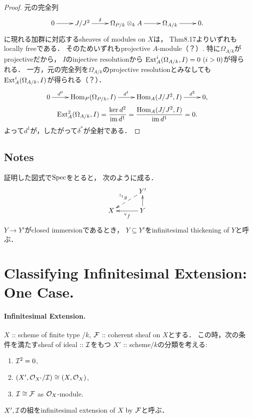 \documentclass[a4paper]{jsarticle}
\newcommand{\Der}{\Omega}
\begin{document}
    \begin{proof}
        元の完全列
        \[
        \xymatrix
        {
            0 \ar[r]& J/J^2 \ar[r]^-{\delta}& \Der_{P/k} \otimes_k A \ar[r]& \Der_{A/k} \ar[r]& 0.
        }
        \]
        に現れる加群に対応するsheaves of modules on $X$は，
        Thm8.17よりいずれもlocally freeである．
        そのためいずれもprojective $A$-module（？）.
        特に$\Der_{A/k}$がprojectiveだから，
        $I$のinjective resolutionから
        $\Ext_A^i(\Der_{A/k}, I)=0~(i>0)$が得られる．
        一方，元の完全列を$\Der_{A/k}$のprojective resolutionとみなしても
        $\Ext_A^i(\Der_{A/k}, I)$が得られる（？）．
        \begin{gather*}
        \xymatrix
        {
            0 \ar[r]^-{d^0}& \Hom_P(\Der_{P/k},I) \ar[r]^-{d^1}& \Hom_A(J/J^2,I) \ar[r]^-{d^2}& 0,
        } \\
        \Ext_A^2(\Der_{A/k},I)=\frac{\ker d^2}{\im d^1}=\frac{\Hom_A(J/J^2,I)}{\im d^1}=0.
        \end{gather*}
        よって$d^1$が，したがって$\delta^*$が全射である．
    \end{proof}

    \subsection*{Notes}
    証明した図式で$\operatorname{Spec}$をとると，
    次のように成る．
    \[
    \xymatrix@R=15pt@C=30pt
    {
        {} & \ar@{-->}[ld]_-{{}^{\exists_1} g} Y'\\
        X  & \ar[l]^-{{}^{\forall} f} Y \ar[u]
    }
    \]
    $Y \to Y'$がclosed immersionであるとき，
    $Y \subseteq Y'$をinfinitesimal thickening of $Y$と呼ぶ．

\section{Classifying Infinitesimal Extension: One Case.} %
    \paragraph{Infinitesimal Extension.}
    $X$ :: scheme of finite type /$k$,
    $\mathcal{F}$ :: coherent sheaf on $X$とする．
    この時，次の条件を満たすsheaf of ideal :: $\mathcal{I}$をもつ
    $X'$ :: scheme/$k$の分類を考える:
    \begin{enumerate}
        \item $\mathcal{I}^2=0$,
        \item $(X', \mathcal{O}_{X'}/\mathcal{I}) \cong (X, \mathcal{O}_X)$,
        \item $\mathcal{I} \cong \mathcal{F}$ as $\mathcal{O}_X$-module.
    \end{enumerate}
    $X', \mathcal{I}$の組をinfinitesimal extension of $X$ by $\mathcal{F}$と呼ぶ．
    
\end{document}
